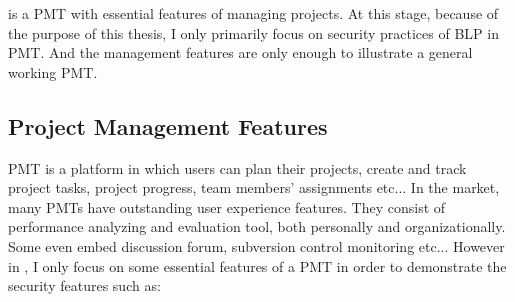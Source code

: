 \myProject is a PMT with essential features of managing projects.
At this stage, because of the purpose of this thesis, I only primarily focus on security practices of BLP in PMT.
And the management features are only enough to illustrate a general working PMT.


\subsection{Project Management Features}
\label{ch:hopot_project:concepts:pm_features} 

PMT is a platform in which users can plan their projects, create and track project tasks, project progress, team members' assignments etc...
In the market, many PMTs have outstanding user experience features.
They consist of performance analyzing and evaluation tool, both personally and organizationally.
Some even embed discussion forum, subversion control monitoring etc...
However in \myProject, I only focus on some essential features of a PMT in order to demonstrate the security features such as:

